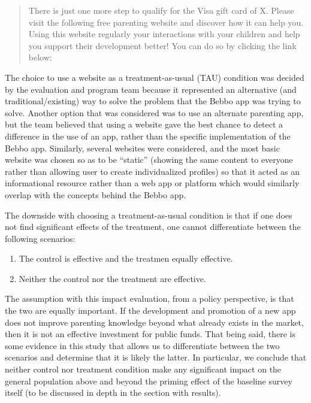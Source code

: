 \documentclass{article}
\begin{document}
\begin{quote}

There is just one more step to qualify for the Visa gift card of X. Please visit the following free parenting website and discover how it can help you. Using this website regularly  your interactions with your children and help you support their development better! You can do so by clicking the link below:
\end{quote}

The choice to use a website as a treatment-as-usual (TAU) condition was decided by the evaluation and program team because it represented an alternative (and traditional/existing) way to solve the problem that the Bebbo app was trying to solve. Another option that was considered was to use an alternate parenting app, but the team believed that using a website gave the best chance to detect a difference in the use of an app, rather than the specific implementation of the Bebbo app. Similarly, several websites were considered, and the most basic website was chosen so as to be ``static'' (showing the same content to everyone rather than allowing user to create individualized profiles) so that it acted as an informational resource rather than a web app or platform which would similarly overlap with the concepts behind the Bebbo app.

The downside with choosing a treatment-as-usual condition is that if one does not find significant effects of the treatment, one cannot differentiate between the following scenarios:

\begin{enumerate}
    \item The control is effective and the treatmen equally effective.
    \item Neither the control nor the treatment are effective.
\end{enumerate}

The assumption with this impact evaluation, from a policy perspective, is that the two are equally important. If the development and promotion of a new app does not improve parenting knowledge beyond what already exists in the market, then it is not an effective investment for public funds. That being said, there is some evidence in this study that allows us to differentiate between the two scenarios and determine that it is likely the latter. In particular, we conclude that neither control nor treatment condition make any significant impact on the general population above and beyond the priming effect of the baseline survey itself (to be discussed in depth in the section with results).
\end{document}
